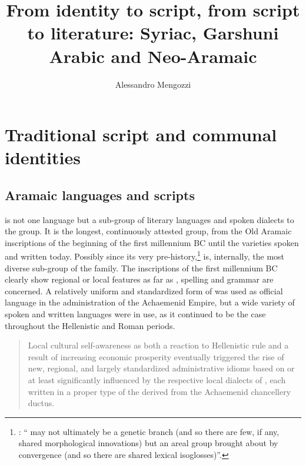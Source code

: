 \documentclass[output=paper,colorlinks,citecolor=brown,arabfont,syriacfont]{langscibook}
\author{Alessandro Mengozzi\orcid{}\affiliation{}}
\title[From identity to script, from script to literature]{From identity to script, from script to literature: Syriac, Garshuni Arabic and Neo-Aramaic}
\begin{document}
\maketitle

\section{Traditional script and communal identities}\label{ch.3.6.ss.1}

\subsection{Aramaic languages and scripts}\label{ch.3.6.ss.1.1}

 is not one language but a sub-group of literary languages and spoken dialects  to the  group. It is the longest, continuously attested group, from the Old Aramaic inscriptions of the beginning of the first millennium BC until the  varieties spoken and written today. Possibly since its very pre-history,\footnote{%
\citet[149]{butts2018}: `` may not ultimately be a genetic branch (and so there are few, if any, shared morphological innovations) but an areal group brought about by  convergence (and so there are shared lexical isoglosses)''.}  is, internally, the most diverse sub-group of the  family. The  inscriptions of the first millennium BC clearly show regional or local features as far as , spelling and grammar are concerned. A relatively uniform and standardized form of  was used as official language in the administration of the Achaemenid Empire, but a wide variety of spoken and written languages were in use, as it continued to be the case throughout the Hellenistic and Roman periods.

\largerpage

\begin{quote}
Local cultural self-awareness as both a reaction to Hellenistic rule and a result of increasing economic prosperity eventually triggered the rise of new, regional, and largely standardized administrative idioms based on or at least significantly influenced by the respective local dialects of , each written in a proper type of the   derived from the Achaemenid chancellery ductus. \citep[279]{gzella2015}
\end{quote}
\end{document}

